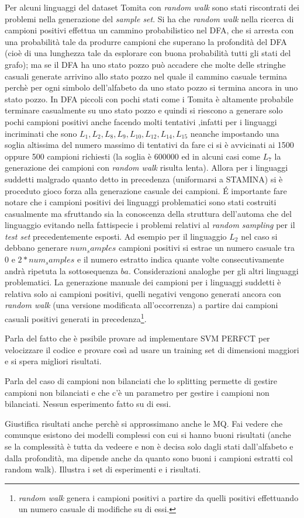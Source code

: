  Per alcuni linguaggi del dataset Tomita con \textit{random walk} sono stati riscontrati dei problemi nella generazione del \textit{sample set}. Si ha che \textit{random walk} nella ricerca di campioni positivi effettua un cammino probabilistico nel \ac{DFA}, che si arresta con una probabilità tale da produrre campioni che superano la profondità del \ac{DFA} (cioè di una lunghezza tale da esplorare con buona probabilità tutti gli stati del grafo); ma se il \ac{DFA} ha uno stato pozzo può accadere che molte delle stringhe casuali generate arrivino allo stato pozzo nel quale il cammino casuale termina perchè per ogni simbolo dell'alfabeto da uno stato pozzo si termina ancora in uno stato pozzo. In \ac{DFA} piccoli con pochi stati come i Tomita è altamente probabile terminare casualmente su uno stato pozzo e quindi si riescono a  generare solo pochi campioni positivi anche facendo molti tentativi ,infatti per i linguaggi incriminati che sono $L_1,L_2,L_8,L_9,L_{10},L_{12},L_{14},L_{15}$ neanche impostando una soglia altissima del numero massimo di tentativi  da fare  ci si è avvicinati ai 1500 oppure 500 campioni richiesti (la soglia è 600000 ed in alcuni casi come $L_7$ la generazione dei campioni con \textit{random walk} risulta lenta). Allora per i linguaggi suddetti malgrado quanto detto in precedenza (uniformarsi a STAMINA) si è proceduto gioco forza alla generazione casuale dei campioni. \'E importante fare notare che  i campioni positivi dei linguaggi problematici sono stati costruiti casualmente ma sfruttando sia la conoscenza della struttura dell'automa che del linguaggio evitando nella fattispecie i problemi relativi al  \textit{random sampling} per il \textit{test set} precedentemente esposti.  Ad esempio per il linguaggio $L_2$ nel caso si debbano generare $num_samples$ campioni positivi si estrae un numero casuale tra $0$ e $2*num_samples$ e il numero estratto indica quante volte consecutivamente andrà ripetuta la sottosequenza  $ba$. Considerazioni analoghe per gli altri linguaggi problematici. La generazione manuale dei campioni per i linguaggi suddetti è relativa solo ai campioni positivi, quelli negativi vengono generati ancora con \textit{random walk} (una versione modificata all'occorrenza) a partire dai campioni casuali positivi generati in precedenza\footnote{\textit{random walk} genera i campioni positivi a partire da quelli positivi effettuando un numero casuale di modifiche su di essi.}.
 



Parla del fatto che è pssibile provare ad implementare SVM PERFCT per velocizzare il codice e provare così ad usare un training set di dimensioni maggiori e si spera migliori risultati.

Parla del caso di campioni non bilanciati che lo splitting permette di gestire campioni non bilanciati e che c'è un parametro per gestire i campioni non bilanciati. Nessun esperimento fatto su di essi.

Giustifica risultati anche perchè si approssimano anche le MQ.
Fai vedere che comunque esistono dei modelli complessi con cui si hanno buoni risultati (anche se la complessità è tutta da vedeere e non è decisa solo dagli stati dall'alfabeto e dalla profondità, ma dipende anche da quanto sono buoni i campioni estratti col random walk).
Illustra i set di esperimenti e i risultati.
